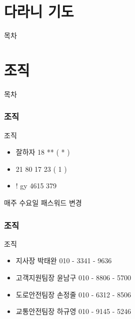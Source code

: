 \documentclass[aspectratio=1610,17pt,xcolor=pdftex,dvipsnames,table,handout]{beamer}
\begin{document}
		\part{다라니 기도}
		\frame{\partpage}


		\begin{frame} [plain]{목차}
		\tableofcontents
		\end{frame}
		


		\part{조직}
		\frame{\partpage}


		\begin{frame} [plain]{목차}
		\tableofcontents
		\end{frame}
		

		\section{조직}
		\frame [plain] {\sectionpage}

		\begin{frame} [t,plain]
			\begin{block} {조직}
			\begin{itemize}
				\item 잘하자 18 ** ( * )
  				\item 21 80 17 23 ( 1 )
				\item ! gy 4615 379 
			\end{itemize}
			매주 수요일 패스워드 변경 
			\end{block}
		\end{frame}




		\section{ 조직}
		\frame [plain] {\sectionpage}

		\begin{frame} [t,plain]
			\begin{block} {조직}
			\begin{itemize}
				\item 지사장	박태완	010 - 3341 - 9636
				\item 고객지원팀장	윤남구	010 - 8806 - 5700
				\item 도로안전팀장	손정줄	010 - 6312 - 8506
				\item 교통안전팀장	하규영	010 - 9145 - 5246
			\end{itemize}
			\end{block}
		\end{frame}
\end{document}

